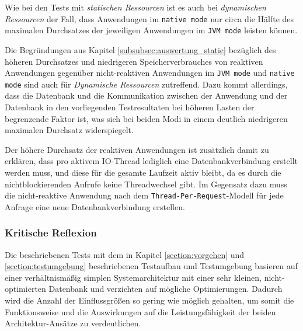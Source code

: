 Wie bei den Tests mit \textit{statischen Ressourcen} ist es auch bei \textit{dynamischen Ressourcen} der Fall, dass Anwendungen im
\verb|native mode| nur circa die Hälfte des maximalen Durchsatzes der jeweiligen Anwendungen im \verb|JVM mode| leisten können.

Die Begründungen aus Kapitel \ref{subsubsec:auswertung_static} bezüglich des höheren Durchsatzes und niedrigeren Speicherverbrauches
von reaktiven Anwendungen gegenüber nicht-reaktiven Anwendungen im \verb|JVM mode| und \verb|native mode| sind auch für
\textit{Dynamische Ressourcen} zutreffend.
Dazu kommt allerdings, dass die Datenbank und die Kommunikation zwischen der Anwendung und der Datenbank in den vorliegenden Testresultaten
bei höheren Lasten der begrenzende Faktor ist, was sich bei beiden Modi in einem deutlich niedrigeren maximalen Durchsatz widerspiegelt.

Der höhere Durchsatz der reaktiven Anwendungen ist zusätzlich damit zu erklären, dass pro aktivem IO-Thread lediglich eine
Datenbankverbindung erstellt werden muss, und diese für die gesamte Laufzeit aktiv bleibt, da es durch die nichtblockierenden
Aufrufe keine Threadwechsel gibt. Im Gegensatz dazu muss die nicht-reaktive Anwendung nach dem \verb|Thread-Per-Request|-Modell
für jede Anfrage eine neue Datenbankverbindung erstellen.
\newpage

\subsubsection{Kritische Reflexion}
\label{subsubsec:auswertung_kritische_reflexion}
Die beschriebenen Tests mit dem in Kapitel \ref{section:vorgehen} und \ref{section:testumgebung} beschriebenen Testaufbau und Testumgebung
basieren auf einer verhältnismäßig simplen Systemarchitektur mit einer sehr kleinen, nicht-optimierten Datenbank und verzichten auf mögliche Optimierungen.
Dadurch wird die Anzahl der Einflussgrößen so gering wie möglich gehalten, um somit die Funktionsweise und die
Auswirkungen auf die Leistungsfähigkeit der beiden Architektur-Ansätze zu verdeutlichen.

